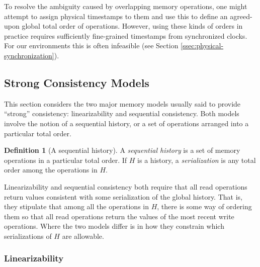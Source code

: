 \documentclass[]             %
{NASA}                       %
\theoremstyle{definition}
\newtheorem{definition}[theorem]{Definition}
\begin{document}
To resolve the ambiguity caused by overlapping memory operations, one
might attempt to assign physical timestamps to them and use this to
define an agreed-upon global total order of operations. However, using
these kinds of orders in practice requires sufficiently fine-grained
timestamps from synchronized clocks. For our environments this is
often infeasible (see Section
\ref{ssec:physical-synchronization}).

\subsection{Strong Consistency Models}
\label{ssec:strong-consistency}
This section considers the two major memory models usually said to
provide ``strong'' consistency: linearizability and sequential
consistency. Both models involve the notion of a sequential history,
or a set of operations arranged into a particular total order.

\begin{definition}[A sequential history]
  \label{def:sequential-history}
  A \emph{sequential history} is a set of memory operations in a
  particular total order. If $H$ is a history, a \emph{serialization}
  is any total order among the operations in $H$.
\end{definition}

Linearizability and sequential consistency both require that all read
operations return values consistent with some serialization of the
global history. That is, they stipulate that among all the operations
in $H$, there is some way of ordering them so that all read operations
return the values of the most recent write operations. Where the two
models differ is in how they constrain which serializations of $H$ are
allowable.

\subsubsection{Linearizability}
\label{sssec:linearizability}
\end{document}
